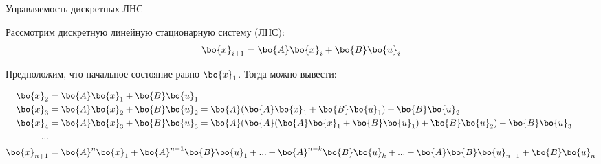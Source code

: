 \documentclass{beamer}
\begin{document}
\begin{frame}{Управляемость дискретных ЛНС}
	\begin{flushleft}
		
		Рассмотрим дискретную линейную стационарную систему (ЛНС):
		\begin{equation}
			\bo{x}_{i+1} = \bo{A}  \bo{x}_i + \bo{B} \bo{u}_i
		\end{equation}
		
		Предположим, что начальное состояние равно $\bo{x}_1$. Тогда можно вывести:
		
		\begin{align*}
			\bo{x}_2 &= \bo{A} \bo{x}_1 + \bo{B} \bo{u}_1 \\
			\bo{x}_3 &= \bo{A} \bo{x}_2 + \bo{B} \bo{u}_2 = \bo{A} (\bo{A} \bo{x}_1 + \bo{B} \bo{u}_1) + \bo{B} \bo{u}_2 \\
			\bo{x}_4 &= \bo{A} \bo{x}_3 + \bo{B} \bo{u}_3 = \bo{A} (\bo{A} (\bo{A} \bo{x}_1 + \bo{B} \bo{u}_1) + \bo{B} \bo{u}_2) + \bo{B} \bo{u}_3 \\
			... \\
			\bo{x}_{n+1} &= \bo{A}^n \bo{x}_1 + \bo{A}^{n-1} \bo{B} \bo{u}_1 + ... + 
			\bo{A}^{n - k} \bo{B} \bo{u}_{k} + ... + 
			\bo{A} \bo{B} \bo{u}_{n-1} +
			\bo{B} \bo{u}_n
		\end{align*}
		
	\end{flushleft}
\end{frame}
\end{document}
